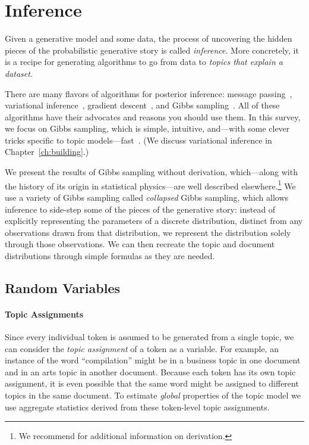 \section{Inference}

Given a generative model and some data, the process of uncovering the hidden
 pieces of the probabilistic generative story is called \emph{inference}.  More
concretely, it is a recipe for generating algorithms to go from data to
\emph{topics that explain a dataset}.

There are many flavors of algorithms for posterior inference: message
passing~\citep{zeng-13}, variational inference~\citep{blei-03},
gradient descent~\citep{hoffman-10}, and Gibbs
sampling~\citep{griffiths-04}.  All of these algorithms have their
advocates and reasons you should use them.  In this survey, we focus
on Gibbs sampling, which is simple, intuitive, and---with some clever
tricks specific to topic models---fast~\citep{yao-09}.  (We discuss
variational inference in Chapter~\ref{ch:building}.)

We present the results of Gibbs sampling without derivation,
which---along with the history of its origin in statistical
physics---are well described elsewhere.\footnote{We recommend
  \citet{resnik-09} for additional information on derivation.} We use
a variety of Gibbs sampling called \emph{collapsed} Gibbs sampling,
which allows inference to side-step some of the pieces of the
generative story: instead of explicitly representing the parameters of
a discrete distribution, distinct from any observations drawn from
that distribution, we represent the distribution solely through those
observations.  We can then recreate the topic and document
distributions through simple formulas as they are needed.

\subsection{Random Variables}

\paragraph{Topic Assignments}

Since every individual token is assumed to be generated from a single topic,
we can consider the {\em topic assignment} of a token as a variable.  For example,
an instance of the word ``compilation'' might be in a business topic in one
document and in an arts topic in another document.  Because each token has its own
topic assignment, it is even possible that the
same word might be assigned to different topics in the same document.
To estimate \emph{global} properties of the topic model we use aggregate statistics derived from these token-level topic assignments.

